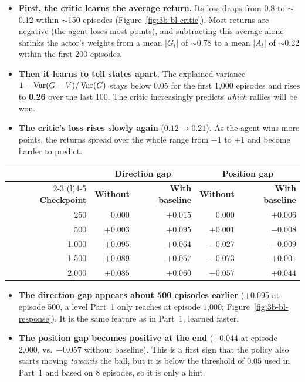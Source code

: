 \begin{itemize}
  \item \textbf{First, the critic learns the average return.} Its loss drops from 0.8 to $\sim$0.12 within $\sim$150 episodes (Figure~\ref{fig:3b-bl-critic}). Most returns are negative (the agent loses most points), and subtracting this average alone shrinks the actor's weights from a mean $|G_t|$ of $\sim$0.78 to a mean $|A_t|$ of $\sim$0.22 within the first 200 episodes.
  \item \textbf{Then it learns to tell states apart.} The explained variance $1 - \operatorname{Var}(G - V)/\operatorname{Var}(G)$ stays below 0.05 for the first 1,000 episodes and rises to \textbf{0.26} over the last 100. The critic increasingly predicts \emph{which} rallies will be won.
  \item \textbf{The critic's loss rises slowly again} ($0.12 \to 0.21$). As the agent wins more points, the returns spread over the whole range from $-1$ to $+1$ and become harder to predict.
\end{itemize}


\begin{center}
\small
\begin{tabular}{@{}rrrrr@{}}
  \toprule
  & \multicolumn{2}{c}{\textbf{Direction gap}} & \multicolumn{2}{c}{\textbf{Position gap}} \\
  \cmidrule(lr){2-3} \cmidrule(l){4-5}
  \textbf{Checkpoint} & \textbf{Without} & \textbf{With baseline} & \textbf{Without} & \textbf{With baseline} \\
  \midrule
  250 & 0.000 & $\mathbf{+0.015}$ & 0.000 & $+0.006$ \\
  500 & $+0.003$ & $\mathbf{+0.095}$ & $+0.001$ & $-0.008$ \\
  1,000 & $+0.095$ & $+0.064$ & $-0.027$ & $-0.009$ \\
  1,500 & $+0.089$ & $+0.057$ & $-0.073$ & $+0.001$ \\
  2,000 & $+0.085$ & $+0.060$ & $-0.057$ & $\mathbf{+0.044}$ \\
  \bottomrule
\end{tabular}
\end{center}

\begin{itemize}
  \item \textbf{The direction gap appears about 500 episodes earlier} (+0.095 at episode 500, a level Part~1 only reaches at episode 1,000; Figure~\ref{fig:3b-bl-response}). It is the same feature as in Part~1, learned faster.
  \item \textbf{The position gap becomes positive at the end} (+0.044 at episode 2,000, vs.\ $-0.057$ without baseline). This is a first sign that the policy also starts moving \emph{towards} the ball, but it is below the threshold of 0.05 used in Part~1 and based on 8 episodes, so it is only a hint.
\end{itemize}

